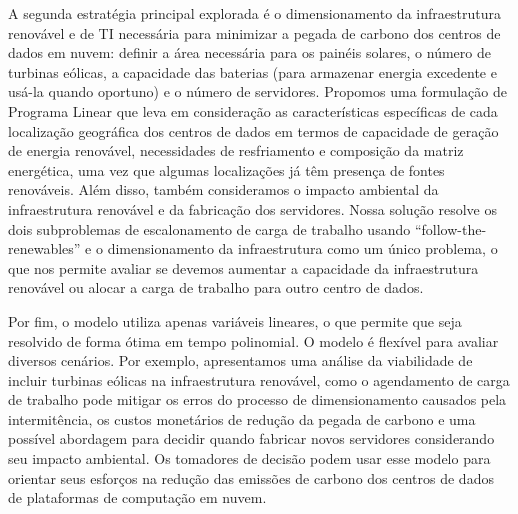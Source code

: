 A segunda estratégia principal explorada é o dimensionamento da infraestrutura renovável e de TI necessária para minimizar a pegada de carbono dos centros de dados em nuvem: definir a área necessária para os painéis solares, o número de turbinas eólicas, a capacidade das baterias (para armazenar energia excedente e usá-la quando oportuno) e o número de servidores. Propomos uma formulação de Programa Linear que leva em consideração as características específicas de cada localização geográfica dos centros de dados em termos de capacidade de geração de energia renovável, necessidades de resfriamento e composição da matriz energética, uma vez que algumas localizações já têm presença de fontes renováveis. Além disso, também consideramos o impacto ambiental da infraestrutura renovável e da fabricação dos servidores. Nossa solução resolve os dois subproblemas de escalonamento de carga de trabalho usando ``follow-the-renewables'' e o dimensionamento da infraestrutura como um único problema, o que nos permite avaliar se devemos aumentar a capacidade da infraestrutura renovável ou alocar a carga de trabalho para outro centro de dados.

Por fim, o modelo utiliza apenas variáveis lineares, o que permite que seja resolvido de forma ótima em tempo polinomial. O modelo é flexível para avaliar diversos cenários. Por exemplo, apresentamos uma análise da viabilidade de incluir turbinas eólicas na infraestrutura renovável, como o agendamento de carga de trabalho pode mitigar os erros do processo de dimensionamento causados pela intermitência, os custos monetários de redução da pegada de carbono e uma possível abordagem para decidir quando fabricar novos servidores considerando seu impacto ambiental. Os tomadores de decisão podem usar esse modelo para orientar seus esforços na redução das emissões de carbono dos centros de dados de plataformas de computação em nuvem.









